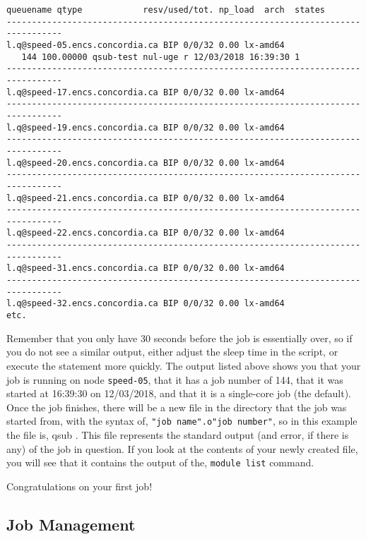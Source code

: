 \documentclass{easychair}
\begin{document}
\small
\begin{verbatim}
queuename qtype            resv/used/tot. np_load  arch  states
--------------------------------------------------------------------------------- 
l.q@speed-05.encs.concordia.ca BIP 0/0/32 0.00 lx-amd64
   144 100.00000 qsub-test nul-uge r 12/03/2018 16:39:30 1 
--------------------------------------------------------------------------------- 
l.q@speed-17.encs.concordia.ca BIP 0/0/32 0.00 lx-amd64  
--------------------------------------------------------------------------------- 
l.q@speed-19.encs.concordia.ca BIP 0/0/32 0.00 lx-amd64  
--------------------------------------------------------------------------------- 
l.q@speed-20.encs.concordia.ca BIP 0/0/32 0.00 lx-amd64  
--------------------------------------------------------------------------------- 
l.q@speed-21.encs.concordia.ca BIP 0/0/32 0.00 lx-amd64  
--------------------------------------------------------------------------------- 
l.q@speed-22.encs.concordia.ca BIP 0/0/32 0.00 lx-amd64  
--------------------------------------------------------------------------------- 
l.q@speed-31.encs.concordia.ca BIP 0/0/32 0.00 lx-amd64  
--------------------------------------------------------------------------------- 
l.q@speed-32.encs.concordia.ca BIP 0/0/32 0.00 lx-amd64  
etc.
\end{verbatim}
\normalsize

Remember that you only have 30 seconds before the job is essentially over, so if you do not see a similar output, either adjust the sleep time in the script, or execute the  statement more quickly. The  output listed above shows you that your job is 
running on node \texttt{speed-05}, that it has a job number of 144, that it was started at 16:39:30 on 12/03/2018, and that it is a single-core job (the default). 
Once the job finishes, there will be a new file in the directory that the job was started from, with the syntax of, \texttt{"job name".o"job number"}, so in this example the file is, qsub . This file represents the standard output (and error, if there is any) of the job in question. If you look at the contents of your newly created file, you will see that it contains the output of the, \texttt{module list} command. 

Congratulations on your first job! 

\subsection{Job Management}
\end{document}
